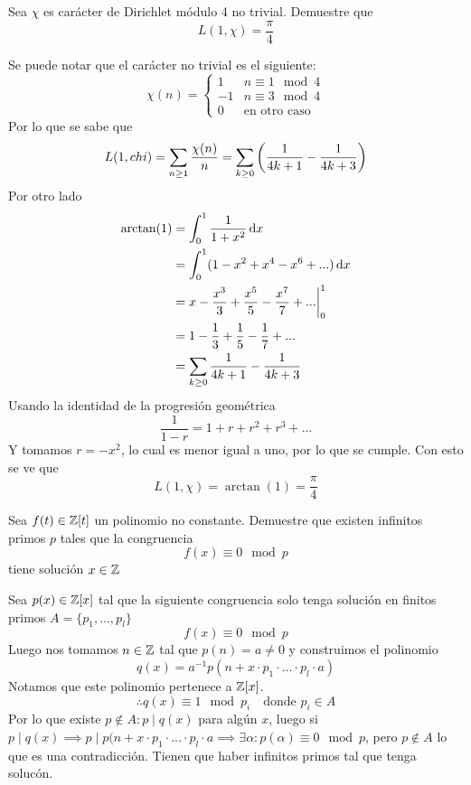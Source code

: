 \begin{prob}[4 pts.]
	Sea $\chi$ es carácter de Dirichlet módulo 4 no trivial. Demuestre que
	\[L(1,\chi)=\frac\pi4\]
\end{prob}

\begin{sol}
	Se puede notar que el carácter no trivial es el siguiente:
	\begin{displaymath}
		\chi(n)=\begin{cases}
			1  & n\equiv1\mod4       \\
			-1 & n\equiv3\mod4       \\
			0  & \text{en otro caso}
		\end{cases}
	\end{displaymath}
	Por lo que se sabe que
	\[
		L(1,chi)=\sum_{n\geq1}\frac{\chi(n)}{n}=\sum_{k\geq0}\left(\frac1{4k+1}-\frac1{4k+3}\right)
	\]
	Por otro lado
	\begin{align*}
		\arctan(1) & =\int_0^1\frac1{1+x^2}\operatorname{d}\!{x}                               \\
		           & =\int_0^1(1-x^2+x^4-x^6+...)\operatorname{d}\!{x}                         \\
		           & =x-\frac{x^3}3+\frac{x^5}5-\frac{x^7}7+...\bigg\rvert_0^1 \\
		           & = 1 -\frac13+\frac15-\frac17+...                          \\
		           & =\sum_{k\geq0}\frac1{4k+1}-\frac1{4k+3}
	\end{align*}
	Usando la identidad de la progresión geométrica
	\[\frac1{1-r}=1+r+r^2+r^3+...\]
	Y tomamos $r=-x^2$, lo cual es menor igual a uno, por lo que se cumple. Con esto se ve que
	\[L(1,\chi)=\arctan(1)=\frac\pi4\]
\end{sol}

\begin{prob}[4 pts.]
	Sea $f(t)\in\mathbb{Z}[t]$ un polinomio no constante. Demuestre que existen infinitos primos $p$ tales que la congruencia
	\[f(x)\equiv 0\mod p\]
	tiene solución $x\in\mathbb{Z}$
\end{prob}

\begin{sol}
	Sea $p(x)\in\mathbb{Z}[x]$ tal que la siguiente congruencia solo tenga solución en finitos primos $A=\{p_1,...,p_l\}$
	\begin{displaymath}
		f(x)\equiv 0\mod p
	\end{displaymath}
	Luego nos tomamos $n\in\mathbb{Z}$ tal que $p(n)=a\neq 0$ y construimos el polinomio
	\begin{displaymath}
		q(x)=a^{-1}p(n+x\cdot p_1\cdot...\cdot p_l\cdot a)
	\end{displaymath}
	Notamos que este polinomio pertenece a $\mathbb{Z}[x]$.
	\begin{displaymath}
		\therefore q(x)\equiv 1\mod p_i\quad\text{donde $p_i\in A$}
	\end{displaymath}
	Por lo que existe $p\notin A: p\mid q(x)$ para algún $x$, luego si $p\mid q(x)\implies p\mid p(n+x\cdot p_1\cdot...\cdot p_l\cdot a\implies \exists \alpha:p(\alpha)\equiv 0\mod p$, pero $p\notin A$ lo que es una contradicción. Tienen que haber infinitos primos tal que tenga solucón.
\end{sol}

